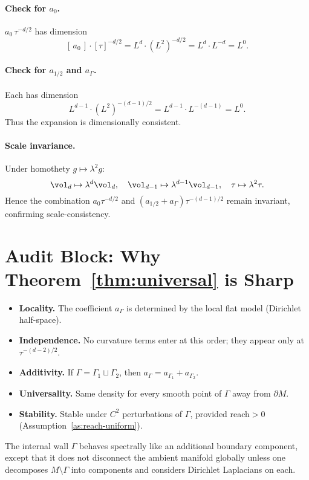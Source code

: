 \paragraph{Check for $a_0$.}
$a_0\,\tau^{-d/2}$ has dimension
\[
[\,a_0\,] \cdot [\tau]^{-d/2} = L^d \cdot (L^2)^{-d/2} = L^d \cdot L^{-d} = L^0.
\]

\paragraph{Check for $a_{1/2}$ and $a_\Gamma$.}
Each has dimension
\[
L^{d-1}\cdot (L^2)^{-(d-1)/2} = L^{d-1} \cdot L^{-(d-1)} = L^0.
\]
Thus the expansion is dimensionally consistent.

\paragraph{Scale invariance.}
Under homothety $g\mapsto \lambda^2 g$:
\[
\vol_d \mapsto \lambda^d \vol_d, \quad
\vol_{d-1} \mapsto \lambda^{d-1}\vol_{d-1}, \quad
\tau \mapsto \lambda^2 \tau.
\]
Hence the combination $a_0\tau^{-d/2}$ and $(a_{1/2}+a_\Gamma)\tau^{-(d-1)/2}$ remain invariant, confirming scale-consistency.

\section{Audit Block: Why Theorem~\ref{thm:universal} is Sharp}
\label{sec:audit-sharp}

\begin{itemize}
  \item \textbf{Locality.} The coefficient $a_\Gamma$ is determined by the local flat model (Dirichlet half-space).
  \item \textbf{Independence.} No curvature terms enter at this order; they appear only at $\tau^{-(d-2)/2}$.
  \item \textbf{Additivity.} If $\Gamma=\Gamma_1\sqcup\Gamma_2$, then $a_\Gamma=a_{\Gamma_1}+a_{\Gamma_2}$.
  \item \textbf{Universality.} Same density for every smooth point of $\Gamma$ away from $\partial M$.
  \item \textbf{Stability.} Stable under $C^2$ perturbations of $\Gamma$, provided reach$>0$ (Assumption~\ref{as:reach-uniform}).
\end{itemize}

\begin{remark}
The internal wall $\Gamma$ behaves spectrally like an additional boundary component,
except that it does not disconnect the ambient manifold globally unless one decomposes $M\setminus\Gamma$ into components and considers Dirichlet Laplacians on each.
\end{remark}

